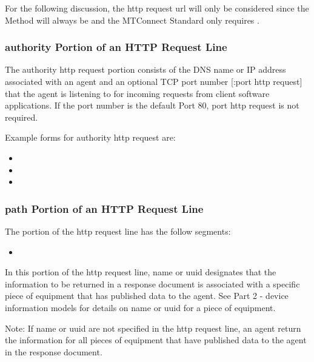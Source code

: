 \documentclass{mtconnect}	%
\begin{document}
For the following discussion, the \gls{http request url} will only be considered since the Method will always be  and the MTConnect Standard only requires .

\subsubsection{authority Portion of an HTTP Request Line}

The \gls{authority http request} portion consists of the DNS name or IP address associated with an \gls{agent} and an optional TCP port number [:\gls{port http request}] that the \gls{agent} is listening to for incoming \glspl{request} from client software applications.  If the port number is the default Port 80, \gls{port http request} is not required.

Example forms for \gls{authority http request} are:

\begin{itemize}
\item {}

\item {}

\item {}
\end{itemize}

\subsubsection{path Portion of an HTTP Request Line}

The  portion of the \gls{http request line} has the follow segments:

\begin{itemize}
\item {}
\end{itemize}

In this portion of the \gls{http request line}, name or uuid designates that the information to be returned in a \gls{response document} is associated with a specific piece of equipment that has published data to the \gls{agent}.  See Part 2 - \glspl{device information model} for details on name or uuid for a piece of equipment.

\begin{note}
Note:  If \gls{name} or \gls{uuid} are not specified in the \gls{http request line}, an \gls{agent} \MUST return the information for all pieces of equipment that have published data to the \gls{agent} in the \gls{response document}.

\end{note}
\end{document}
